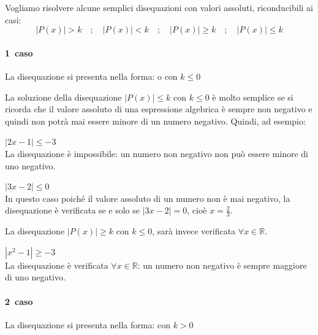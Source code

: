 Vogliamo risolvere alcune semplici disequazioni con valori assoluti, 
riconducibili ai casi:
\[|P(x)|>k \quad; \quad |P(x)|<k\quad; \quad |P(x)|\geq k\quad; \quad |P(x)|\leq k\]


\paragraph{1\textdegree~caso} La disequazione si presenta nella forma:  
 o  con \(k\leq 0\)

\vspace{4pt}

La soluzione della disequazione \(|P(x)|\leq k\) con \(k\leq 0\) è molto semplice 
se si ricorda che il valore assoluto di una espressione algebrica è sempre non 
negativo e quindi non potrà mai essere minore di un numero negativo. Quindi, ad esempio:

\begin{esempio}  
\(|2x-1|\leq -3\) \\[4pt] La disequazione è impossibile: un numero non negativo non può essere minore di uno negativo.
\end{esempio}
\begin{esempio} \(|3x-2|\leq 0\) \\[4pt] In questo caso poiché il 
valore assoluto di un numero non è mai negativo, la disequazione è verificata 
se e solo se \(|3x-2|=0\), cioè \(x=\frac{2}{3}\).
\end{esempio}

La disequazione \(|P(x)|\geq k\) con \(k\leq 0\), sarà invece verificata \(\forall x 
\in \mathbb{R}\).

\begin{esempio} \(|x^2-1|\geq -3\)\\[4pt] La disequazione è 
verificata \(\forall x \in \mathbb{R}\): un numero non negativo è sempre maggiore di uno negativo.
\end{esempio}

\paragraph{2\textdegree~caso} La disequazione si presenta nella forma:  
 con \(k> 0\)

